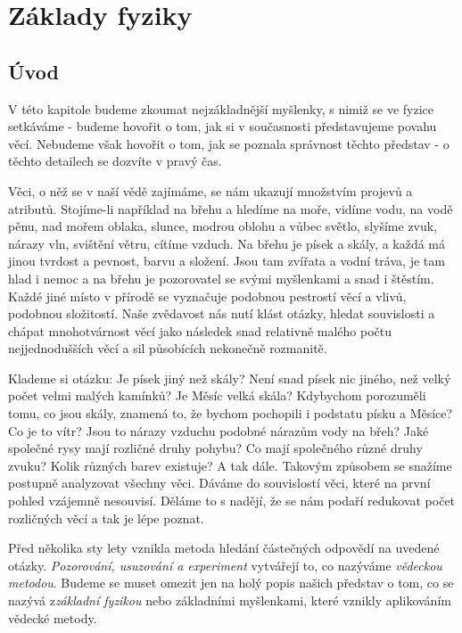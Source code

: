 \chapter{Základy fyziky}
\minitoc
\newpage
  \section{Úvod}
    V této kapitole budeme zkoumat nejzákladnější myšlenky, s nimiž se ve fyzice setkáváme - budeme hovořit o 
    tom, jak si v současnosti představujeme povahu věcí. Nebudeme však hovořit o tom, jak se poznala 
    správnost těchto představ - o těchto detailech se dozvíte v pravý čas.
    
    Věci, o něž se v naší vědě zajímáme, se nám ukazují množstvím projevů a atributů. Stojíme-li například na 
    břehu a hledíme na moře, vidíme vodu, na vodě pěnu, nad mořem oblaka, slunce, modrou oblohu a vůbec 
    světlo, slyšíme zvuk, nárazy vln, svištění větru, cítíme vzduch. Na břehu je písek a skály, a každá má 
    jinou tvrdost a pevnost, barvu a složení. Jsou tam zvířata a vodní tráva, je tam hlad i nemoc a na břehu 
    je pozorovatel se svými myšlenkami a snad i štěstím. Každé jiné místo v přírodě se vyznačuje podobnou 
    pestrostí věcí a vlivů, podobnou složitostí. Naše zvědavost nás nutí klást otázky, hledat souvislosti a 
    chápat mnohotvárnost věcí jako následek snad relativně malého počtu nejjednodušších věcí a sil působících 
    nekonečně rozmanitě.
    
    Klademe si otázku: Je písek jiný než skály? Není snad písek nic jiného, než velký počet velmi malých 
    kamínků? Je Měsíc velká skála? Kdybychom porozuměli tomu, co jsou skály, znamená to, že bychom pochopili 
    i podstatu písku a Měsíce? Co je to vítr? Jsou to nárazy vzduchu podobné nárazům vody na břeh? Jaké 
    společné rysy mají rozličné druhy pohybu? Co mají společného různé druhy zvuku? Kolik různých barev 
    existuje? A tak dále. Takovým způsobem se snažíme postupně analyzovat všechny věci. Dáváme do souvislostí 
    věci, které na první pohled vzájemně nesouvisí. Děláme to s nadějí, že se nám podaří redukovat počet 
    rozličných věcí a tak je lépe poznat.
    
    Před několika sty lety vznikla metoda hledání částečných odpovědí na uvedené otázky. \emph{Pozorování, 
    usuzování a experiment} vytvářejí to, co nazýváme \emph{vědeckou metodou}. Budeme se muset omezit jen na 
    holý popis našich představ o tom, co se nazývá z\emph{základní fyzikou} nebo základními myšlenkami, které 
    vznikly aplikováním vědecké metody.
    
